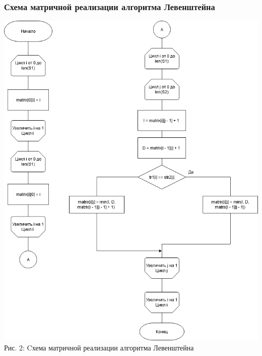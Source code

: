 \documentclass[12pt,a4paper]{article}
\begin{document}
\subsubsection{Схема матричной реализации алгоритма Левенштейна}
\begin{center}	
	\includegraphics[width=.9\linewidth]{lev_matr}\\
	Рис. 2: Cхема матричной реализации алгоритма Левенштейна
\end{center}
\clearpage
\end{document}
